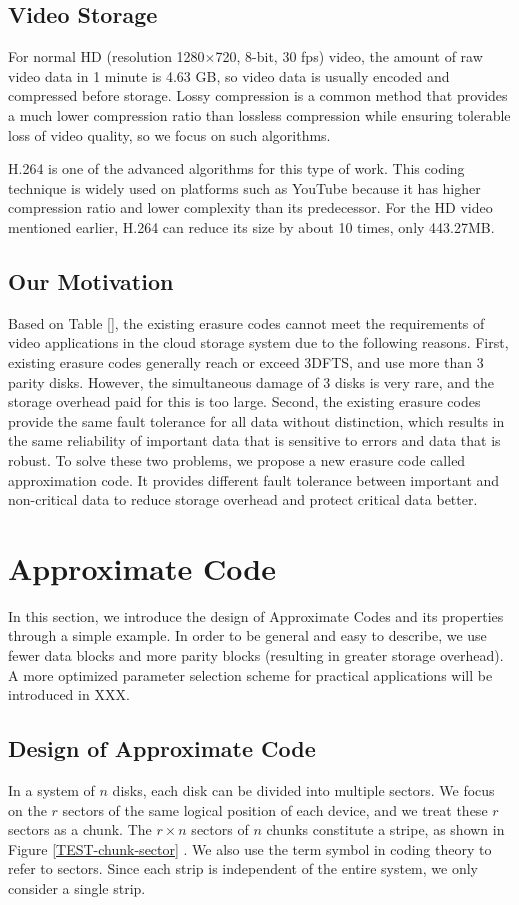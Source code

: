 \documentclass[conference]{IEEEtran}
\begin{document}
\subsection{Video Storage}
For normal HD (resolution 1280$\times$720, 8-bit, 30 fps) video, the amount of raw video data in 1 minute is 4.63 GB, so video data is usually encoded and compressed before storage. Lossy compression is a common method that provides a much lower compression ratio than lossless compression while ensuring tolerable loss of video quality, so we focus on such algorithms. 

H.264 is one of the advanced algorithms for this type of work. This coding technique is widely used on platforms such as YouTube because it has higher compression ratio and lower complexity than its predecessor. For the HD video mentioned earlier, H.264 can reduce its size by about 10 times, only 443.27MB.

\subsection{Our Motivation}
Based on Table [], the existing erasure codes cannot meet the requirements of video applications in the cloud storage system due to the following reasons. First, existing erasure codes generally reach or exceed 3DFTS, and use more than 3 parity disks. However, the simultaneous damage of 3 disks is very rare, and the storage overhead paid for this is too large. Second, the existing erasure codes provide the same fault tolerance for all data without distinction, which results in the same reliability of important data that is sensitive to errors and data that is robust. To solve these two problems, we propose a new erasure code called approximation code. It provides different fault tolerance between important and non-critical data to reduce storage overhead and protect critical data better.

\section{Approximate Code}
In this section, we introduce the design of Approximate Codes and its properties through a simple example. In order to be general and easy to describe, we use fewer data blocks and more parity blocks (resulting in greater storage overhead). A more optimized parameter selection scheme for practical applications will be introduced in XXX.

\subsection{Design of Approximate Code}
In a system of $n$ disks, each disk can be divided into multiple sectors. We focus on the $r$ sectors of the same logical position of each device, and we treat these $r$ sectors as a chunk. The $r \times n$ sectors of $n$ chunks constitute a stripe, as shown in Figure \ref{TEST-chunk-sector} . We also use the term symbol in coding theory to refer to sectors. Since each strip is independent of the entire system, we only consider a single strip.
\end{document}
